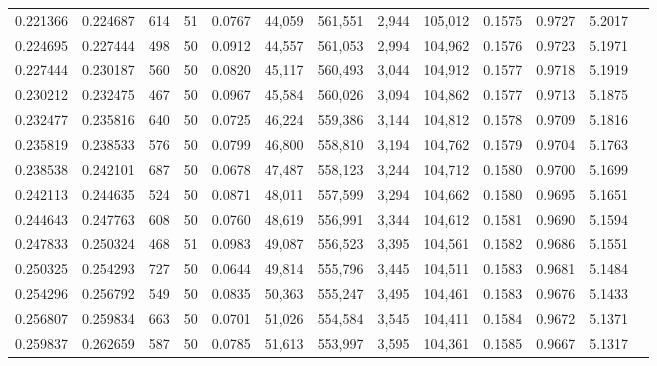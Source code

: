 \begin{tabular}{rrrrrrrrrrrrr}
0.221366 & 0.224687 &   614 &  51 &                                     0.0767 &  44,059 & 561,551 &   2,944 & 105,012 & 0.1575 & 0.9727 & 5.2017 \\
0.224695 & 0.227444 &   498 &  50 &                                     0.0912 &  44,557 & 561,053 &   2,994 & 104,962 & 0.1576 & 0.9723 & 5.1971 \\
0.227444 & 0.230187 &   560 &  50 &                                     0.0820 &  45,117 & 560,493 &   3,044 & 104,912 & 0.1577 & 0.9718 & 5.1919 \\
0.230212 & 0.232475 &   467 &  50 &                                     0.0967 &  45,584 & 560,026 &   3,094 & 104,862 & 0.1577 & 0.9713 & 5.1875 \\
0.232477 & 0.235816 &   640 &  50 &                                     0.0725 &  46,224 & 559,386 &   3,144 & 104,812 & 0.1578 & 0.9709 & 5.1816 \\
0.235819 & 0.238533 &   576 &  50 &                                     0.0799 &  46,800 & 558,810 &   3,194 & 104,762 & 0.1579 & 0.9704 & 5.1763 \\
0.238538 & 0.242101 &   687 &  50 &                                     0.0678 &  47,487 & 558,123 &   3,244 & 104,712 & 0.1580 & 0.9700 & 5.1699 \\
0.242113 & 0.244635 &   524 &  50 &                                     0.0871 &  48,011 & 557,599 &   3,294 & 104,662 & 0.1580 & 0.9695 & 5.1651 \\
0.244643 & 0.247763 &   608 &  50 &                                     0.0760 &  48,619 & 556,991 &   3,344 & 104,612 & 0.1581 & 0.9690 & 5.1594 \\
0.247833 & 0.250324 &   468 &  51 &                                     0.0983 &  49,087 & 556,523 &   3,395 & 104,561 & 0.1582 & 0.9686 & 5.1551 \\
0.250325 & 0.254293 &   727 &  50 &                                     0.0644 &  49,814 & 555,796 &   3,445 & 104,511 & 0.1583 & 0.9681 & 5.1484 \\
0.254296 & 0.256792 &   549 &  50 &                                     0.0835 &  50,363 & 555,247 &   3,495 & 104,461 & 0.1583 & 0.9676 & 5.1433 \\
0.256807 & 0.259834 &   663 &  50 &                                     0.0701 &  51,026 & 554,584 &   3,545 & 104,411 & 0.1584 & 0.9672 & 5.1371 \\
0.259837 & 0.262659 &   587 &  50 &                                     0.0785 &  51,613 & 553,997 &   3,595 & 104,361 & 0.1585 & 0.9667 & 5.1317 \\

\end{tabular}
